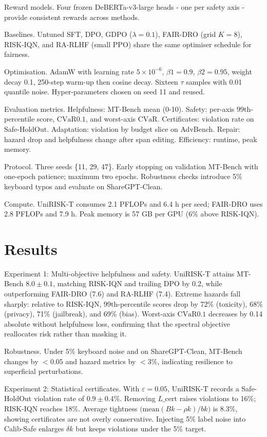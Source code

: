 \documentclass{article}
\begin{document}
Reward models. Four frozen DeBERTa-v3-large heads - one per safety axis - provide consistent rewards across methods.

Baselines. Untuned SFT, DPO, GDPO ($\lambda=0.1$), FAIR-DRO (grid $K=8$), RISK-IQN, and RA-RLHF (small PPO) share the same optimiser schedule for fairness.

Optimisation. AdamW with learning rate $5 \times 10^{-6}$, $\beta1 = 0.9$, $\beta2 = 0.95$, weight decay 0.1, 250-step warm-up then cosine decay. Sixteen $\tau$ samples with 0.01 quantile noise. Hyper-parameters chosen on seed 11 and reused.

Evaluation metrics. Helpfulness: MT-Bench mean (0-10). Safety: per-axis 99th-percentile score, $\mathrm{CVaR}{0.1}$, and worst-axis $\mathrm{CVaR}$. Certificates: violation rate on Safe-HoldOut. Adaptation: violation by budget slice on AdvBench. Repair: hazard drop and helpfulness change after span editing. Efficiency: runtime, peak memory.

Protocol. Three seeds \{11, 29, 47\}. Early stopping on validation MT-Bench with one-epoch patience; maximum two epochs. Robustness checks introduce 5\% keyboard typos and evaluate on ShareGPT-Clean.

Compute. UniRISK-T consumes 2.1 PFLOPs and 6.4 h per seed; FAIR-DRO uses 2.8 PFLOPs and 7.9 h. Peak memory is 57 GB per GPU (6\% above RISK-IQN).

\section{Results}
Experiment 1: Multi-objective helpfulness and safety. UniRISK-T attains MT-Bench $8.0 \pm 0.1$, matching RISK-IQN and trailing DPO by 0.2, while outperforming FAIR-DRO (7.6) and RA-RLHF (7.4). Extreme hazards fall sharply: relative to RISK-IQN, 99th-percentile scores drop by 72\% (toxicity), 68\% (privacy), 71\% (jailbreak), and 69\% (bias). Worst-axis $\mathrm{CVaR}{0.1}$ decreases by 0.14 absolute without helpfulness loss, confirming that the spectral objective reallocates risk rather than masking it.

Robustness. Under 5\% keyboard noise and on ShareGPT-Clean, MT-Bench changes by $<0.05$ and hazard metrics by $<3$\%, indicating resilience to superficial perturbations.

Experiment 2: Statistical certificates. With $\varepsilon = 0.05$, UniRISK-T records a Safe-HoldOut violation rate of $0.9 \pm 0.4$\%. Removing $L\_{\text{cert}}$ raises violations to 16\%; RISK-IQN reaches 18\%. Average tightness $\big(\text{mean}(Bk-\rhok)/bk\big)$ is 8.3\%, showing certificates are not overly conservative. Injecting 5\% label noise into Calib-Safe enlarges $\deltak$ but keeps violations under the 5\% target.
\end{document}
